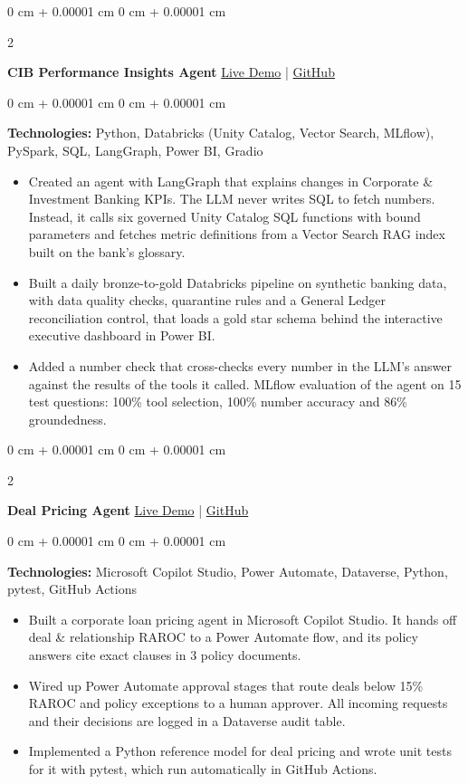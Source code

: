 \documentclass[10pt, letterpaper]{article}
\newenvironment{highlights}{
    \begin{itemize}[
        topsep=0.10 cm,
        parsep=0.10 cm,
        partopsep=0pt,
        itemsep=0pt,
        leftmargin=0 cm + 10pt
    ]
}{
    \end{itemize}
} %
\newenvironment{onecolentry}{
    \begin{adjustwidth}{
        0 cm + 0.00001 cm
    }{
        0 cm + 0.00001 cm
    }
}{
    \end{adjustwidth}
} %
\newenvironment{twocolentry}[2][]{
    \onecolentry
    \def\secondColumn{#2}
    \setcolumnwidth{\fill, 4.5 cm}
    \begin{paracol}{2}
}{
    \switchcolumn \raggedleft \secondColumn
    \end{paracol}
    \endonecolentry
} %
\begin{document}
        \begin{twocolentry}{
            \href{https://insights.inkandinfra.com}{Live Demo} |
            \href{https://github.com/hpk369/northlake-cib-insights-agent}{GitHub}
        }
            \textbf{CIB Performance Insights Agent}\end{twocolentry}
        \vspace{0.10 cm}
        \begin{onecolentry}
            \textbf{Technologies:}\> Python, Databricks (Unity Catalog, Vector Search, MLflow), PySpark, SQL, LangGraph, Power BI, Gradio
            \begin{highlights}
                \item Created an agent with LangGraph that explains changes in Corporate \& Investment Banking KPIs. The LLM never writes SQL to fetch numbers. Instead, it calls six governed Unity Catalog SQL functions with bound parameters and fetches metric definitions from a Vector Search RAG index built on the bank's glossary.
                \item Built a daily bronze-to-gold Databricks pipeline on synthetic banking data, with data quality checks, quarantine rules and a General Ledger reconciliation control, that loads a gold star schema behind the interactive executive dashboard in Power BI.
                \item Added a number check that cross-checks every number in the LLM's answer against the results of the tools it called. MLflow evaluation of the agent on 15 test questions: 100\% tool selection, 100\% number accuracy and 86\% groundedness.
            \end{highlights}
        \end{onecolentry}

        \begin{twocolentry}{
            \href{https://deals.inkandinfra.com}{Live Demo} |
            \href{https://github.com/hpk369/northlake-deal-pricing-agent}{GitHub}
        }
            \textbf{Deal Pricing Agent}\end{twocolentry}
        \vspace{0.10 cm}
        \begin{onecolentry}
            \textbf{Technologies:}\> Microsoft Copilot Studio, Power Automate, Dataverse, Python, pytest, GitHub Actions
            \begin{highlights}
                \item Built a corporate loan pricing agent in Microsoft Copilot Studio. It hands off deal \& relationship RAROC to a Power Automate flow, and its policy answers cite exact clauses in 3 policy documents.
                \item Wired up Power Automate approval stages that route deals below 15\% RAROC and policy exceptions to a human approver. All incoming requests and their decisions are logged in a Dataverse audit table.
                \item Implemented a Python reference model for deal pricing and wrote unit tests for it with pytest, which run automatically in GitHub Actions.
            \end{highlights}
        \end{onecolentry}
\end{document}
